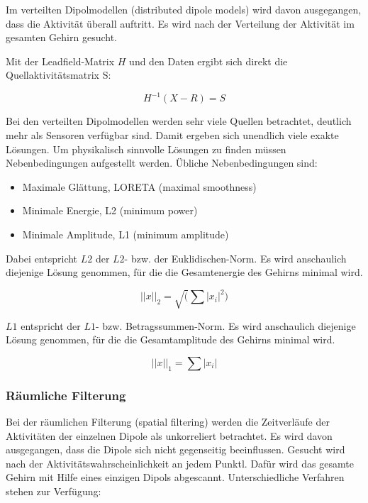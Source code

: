 \documentclass[doc,a4paper,12pt]{apa6}
\begin{document}
Im verteilten Dipolmodellen (distributed dipole models) wird davon ausgegangen, dass die Aktivität überall auftritt. Es wird nach der Verteilung der Aktivität im gesamten Gehirn gesucht.

Mit der Leadfield-Matrix $H$ und den Daten ergibt sich direkt die Quellaktivitätsmatrix S:

\begin{equation}
H^{-1} ( X - R ) = S
\end{equation}

Bei den verteilten Dipolmodellen werden sehr viele Quellen betrachtet, deutlich mehr als Sensoren verfügbar sind. Damit ergeben sich unendlich viele exakte Lösungen. Um physikalisch sinnvolle Lösungen zu finden müssen Nebenbedingungen aufgestellt werden. Übliche Nebenbedingungen sind:

\begin{itemize}
\item Maximale Glättung, LORETA (maximal smoothness)
\item Minimale Energie, L2 (minimum power)
\item Minimale Amplitude, L1 (minimum amplitude)
\end{itemize}

Dabei entspricht $L2$ der $L2$- bzw. der Euklidischen-Norm. Es wird anschaulich diejenige Lösung genommen, für die die Gesamtenergie des Gehirns minimal wird.

\begin{equation}
||x||_2 = \sqrt(\sum |x_i|^2)
\end{equation}

$L1$ entspricht der $L1$- bzw. Betragssummen-Norm. Es wird anschaulich diejenige Lösung genommen, für die die Gesamtamplitude des Gehirns minimal wird.

\begin{equation}
||x||_1 = \sum |x_i|
\end{equation}

\subsubsection{Räumliche Filterung}

Bei der räumlichen Filterung (spatial filtering) werden die Zeitverläufe der Aktivitäten der einzelnen Dipole als unkorreliert betrachtet. Es wird davon ausgegangen, dass die Dipole sich nicht gegenseitig beeinflussen. Gesucht wird nach der Aktivitätswahrscheinlichkeit an jedem Punktl. Dafür wird das gesamte Gehirn mit Hilfe eines einzigen Dipols abgescannt. Unterschiedliche Verfahren stehen zur Verfügung:
\end{document}
